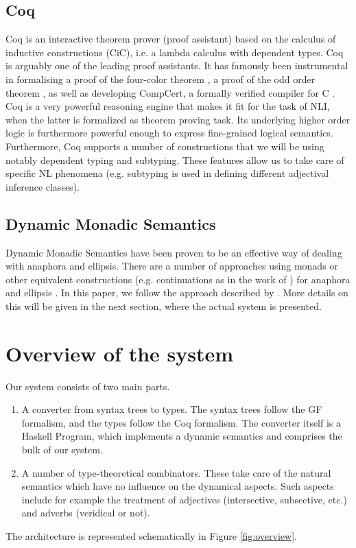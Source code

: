 \documentclass[11pt]{article}
\begin{document}
\subsection{Coq}
Coq is an interactive theorem prover (proof assistant) based on the
calculus of inductive constructions (CiC), i.e.  a lambda calculus
with dependent types. Coq is arguably one of the leading proof
assistants. It has famously been instrumental in formalising a proof
of the four-color theorem \citep{Gonthier:2008}, a proof of the odd
order theorem \citep{Gonthier:2013}, as well as developing CompCert, a
formally verified compiler for C \citep{Leroy}. Coq is a very powerful
reasoning engine that makes it fit for the task of NLI, when the
latter is formalized as theorem proving task. Its underlying higher
order logic is furthermore powerful enough to express fine-grained
logical semantics. Furthermore, Coq supports a number of constructions
that we will be using notably dependent typing and subtyping. These
features allow us to take care of specific NL phenomena
(e.g. subtyping is used in defining different adjectival inference
classes).

\subsection{Dynamic Monadic Semantics}
Dynamic Monadic Semantics have been proven to be an effective way of
dealing with anaphora and ellipsis. There are a number of approaches
using monads or other equivalent constructions (e.g. continuations as in the work of
\citet{de2006}) for anaphora and ellipsis
\citet{Shan:2002,unger:2011,Barker:04,de2016,charlow:2017}. In this
paper, we follow the approach described by
\citet{bernardy_jolli}. More details on this will be given in the next
section, where the actual system is presented.



\section{Overview of the system}

Our system consists of two main parts.
\begin{enumerate}
\item A converter from syntax trees to types. The syntax trees follow
  the GF formalism, and the types follow the Coq formalism. The
  converter itself is a Haskell Program, which implements a dynamic
  semantics and comprises the bulk of our system.
\item A number of type-theoretical combinators. These take care of the
  natural semantics which have no influence on the dynamical
  aspects. Such aspects include for example the treatment of adjectives
  (intersective, subsective, etc.) and adverbs (veridical or not).
\end{enumerate}
The architecture is represented schematically in Figure \ref{fig:overview}.
\end{document}
